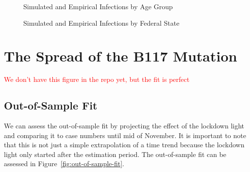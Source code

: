 \begin{figure}[ht]
\centering
\caption{Simulated and Empirical Infections by Age Group}
\label{fig:age_group_fit}
\end{figure}


\begin{figure}[ht]
\centering
\caption{Simulated and Empirical Infections by Federal State}
\label{fig:state_fit}
\end{figure}



\FloatBarrier


\section{The Spread of the B117 Mutation}


\textcolor{red}{We don't have this figure in the repo yet, but the fit is perfect}



\FloatBarrier

\subsection{Out-of-Sample Fit}
\label{sub:out_of_sample_fit}

We can assess the out-of-sample fit by projecting the effect of the lockdown light and
comparing it to case numbers until mid of November. It is important to note that this
is not just a simple extrapolation of a time trend because the lockdown light only started
after the estimation period. The out-of-sample fit can be assessed in
Figure~\ref{fig:out-of-sample-fit}.

